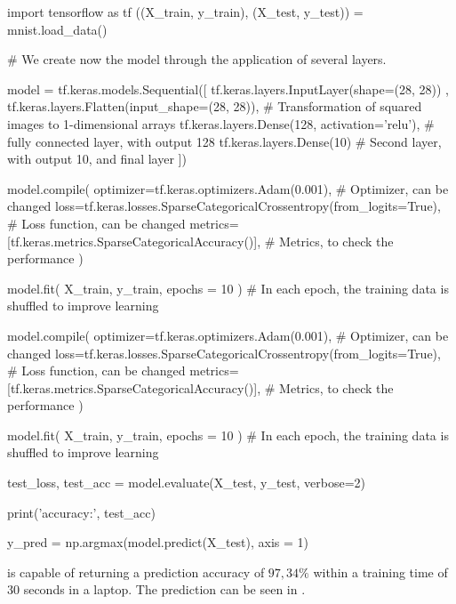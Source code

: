 \documentclass[]{report}
\begin{document}
\begin{boxedverbatim}
import tensorflow as tf
((X_train, y_train), (X_test, y_test)) = mnist.load_data()

# We create now the model through the application of several layers. 

model = tf.keras.models.Sequential([
  tf.keras.layers.InputLayer(shape=(28, 28)) , 
  tf.keras.layers.Flatten(input_shape=(28, 28)), # Transformation of squared images to 1-dimensional arrays
  tf.keras.layers.Dense(128, activation='relu'), # fully connected layer, with output 128
  tf.keras.layers.Dense(10)                      # Second layer, with output 10, and final layer
])

model.compile(
    optimizer=tf.keras.optimizers.Adam(0.001), # Optimizer, can be changed
    loss=tf.keras.losses.SparseCategoricalCrossentropy(from_logits=True), # Loss function, can be changed
    metrics=[tf.keras.metrics.SparseCategoricalAccuracy()], # Metrics, to check the performance
)

model.fit(
    X_train, y_train, epochs = 10
) # In each epoch, the training data is shuffled to improve learning


model.compile(
    optimizer=tf.keras.optimizers.Adam(0.001), # Optimizer, can be changed
    loss=tf.keras.losses.SparseCategoricalCrossentropy(from_logits=True), # Loss function, can be changed
    metrics=[tf.keras.metrics.SparseCategoricalAccuracy()], # Metrics, to check the performance
)

model.fit(
    X_train, y_train, epochs = 10
) # In each epoch, the training data is shuffled to improve learning

test_loss, test_acc = model.evaluate(X_test, y_test, verbose=2)

print('\nTest accuracy:', test_acc)

y_pred = np.argmax(model.predict(X_test), axis = 1)
\end{boxedverbatim}
\vskip5mm

is capable of returning a prediction accuracy of $97,34\%$ within a training time of 30 seconds in a laptop. The prediction can be seen in . 
\end{document}
